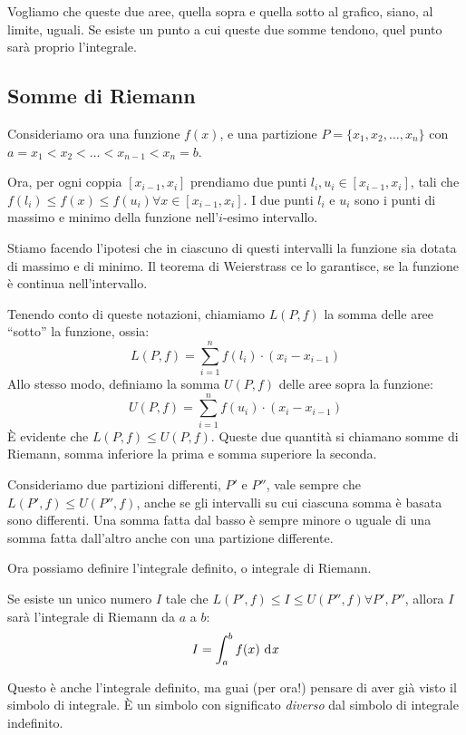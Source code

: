 Vogliamo che queste due aree, quella sopra e quella sotto al grafico, siano, al limite, uguali. Se esiste un punto a cui queste due somme tendono, quel punto sar\`a proprio l'integrale.

\subsection{Somme di Riemann}

Consideriamo ora una funzione $f(x)$, e una partizione $P = \{ x_1, x_2, \ldots, x_n \}$ con $a = x_1 < x_2 < \ldots < x_{n-1} < x_n = b$.

Ora, per ogni coppia $[x_{i-1}, x_{i}]$ prendiamo due punti $l_i, u_i \in [x_{i-1}, x_{i}]$, tali che $f(l_i) \le f(x) \le f(u_i) \forall x \in [x_{i-1},x_{i}]$. I due punti $l_i$ e $u_i$ sono i punti di massimo e minimo della funzione nell'$i$-esimo intervallo.

Stiamo facendo l'ipotesi che in ciascuno di questi intervalli la funzione sia dotata di massimo e di minimo. Il teorema di Weierstrass ce lo garantisce, se la funzione \`e continua nell'intervallo.

Tenendo conto di queste notazioni, chiamiamo $L(P,f)$ la somma delle aree ``sotto'' la funzione, ossia:
\[
L(P,f) = \sum_{i = 1}^{n} f(l_i) \cdot (x_{i} - x_{i-1})
\]
Allo stesso modo, definiamo la somma $U(P,f)$ delle aree sopra la funzione:
\[
U(P,f) = \sum_{i = 1}^{n} f(u_i) \cdot (x_{i} - x_{i-1})
\]
\`E evidente che $L(P,f) \le U(P,f)$. Queste due quantit\`a si chiamano somme di Riemann, somma inferiore la prima e somma superiore la seconda.

Consideriamo due partizioni differenti, $P'$ e $P''$, vale sempre che $L(P',f) \le U(P'',f)$, anche se gli intervalli su cui ciascuna somma \`e basata sono differenti. Una somma fatta dal basso \`e sempre minore o uguale di una somma fatta dall'altro anche con una partizione differente.

Ora possiamo definire l'integrale definito, o integrale di Riemann.

\begin{defn}
Se esiste un unico numero $I$ tale che $L(P',f) \le I \le U(P'',f) \forall P', P''$, allora $I$ sar\`a l'integrale di Riemann da $a$ a $b$:
\[
I = \int_{a}^{b} f(x) \dx
\]
\end{defn}
Questo \`e anche l'integrale definito, ma guai (per ora!) pensare di aver gi\`a visto il simbolo di integrale. \`E un simbolo con significato \emph{diverso} dal simbolo di integrale indefinito.

